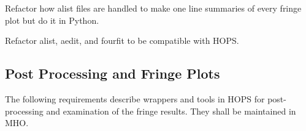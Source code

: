 \begin{description}
 Refactor how alist files are handled to make one line
    summaries of every fringe plot but do it in Python.

 Refactor alist, aedit, and fourfit to be compatible with \ac{HOPS}.


%

\end{description}



\subsection{Post Processing and Fringe Plots}
\label{sec:postprocreq}
The following requirements describe wrappers and tools
 in HOPS for post-processing and examination of the fringe results.
They shall be maintained in MHO.


